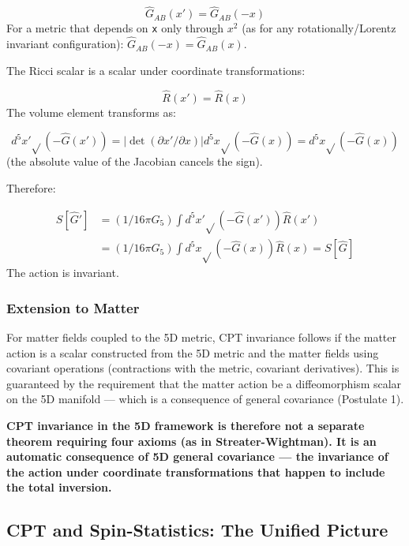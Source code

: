 \documentclass[aps,prd,preprint,superscriptaddress,longbibliography,floatfix]{revtex4-2}
\theoremstyle{remark}
\begin{document}
\begin{equation}
    \hat{G}_{AB}(x') = \hat{G}_{AB}(-x)
\end{equation}
For a metric that depends on \texttt{x} only through $x^{2}$ (as for any rotationally/Lorentz invariant configuration): $\hat{G}_{AB}(-x) = \hat{G}_{AB}(x)$.

The Ricci scalar is a scalar under coordinate transformations:


\begin{equation}
    \hat{R}(x') = \hat{R}(x)
\end{equation}
The volume element transforms as:


\begin{equation}
    d^{5}x' \sqrt{}(-\hat{G}(x')) = |\det(\partial x'/\partial x)| d^{5}x \sqrt{}(-\hat{G}(x)) = d^{5}x \sqrt{}(-\hat{G}(x))
\end{equation}
(the absolute value of the Jacobian cancels the sign).

Therefore:


\begin{align}
    S[\hat{G}'] &= (1/16\pi G_{5}) \int d^{5}x' \sqrt{}(-\hat{G}(x')) \hat{R}(x') \\
    & = (1/16\pi G_{5}) \int d^{5}x \sqrt{}(-\hat{G}(x)) \hat{R}(x) = S[\hat{G}]
\end{align}
The action is invariant.


\subsubsection{Extension to Matter}

For matter fields coupled to the 5D metric, CPT invariance follows if the matter action is a scalar constructed from the 5D metric and the matter fields using covariant operations (contractions with the metric, covariant derivatives). This is guaranteed by the requirement that the matter action be a diffeomorphism scalar on the 5D manifold --- which is a consequence of general covariance (Postulate 1).

\textbf{CPT invariance in the 5D framework is therefore not a separate theorem requiring four axioms (as in Streater-Wightman). It is an automatic consequence of 5D general covariance --- the invariance of the action under coordinate transformations that happen to include the total inversion.}



\subsection{CPT and Spin-Statistics: The Unified Picture}
\end{document}
